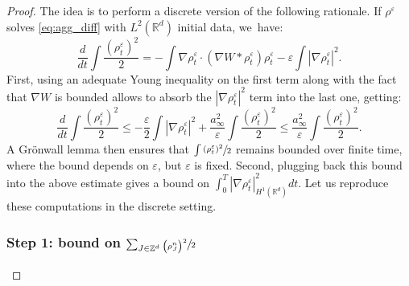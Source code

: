 \documentclass[JEP,XML,SOM,Unicode, NoFloatCountersInSection,published]{cedram}
\def\RR{\mathbb{R}}
\def\ZZ{\mathbb{Z}}
\def\eps{\varepsilon}
\theoremstyle{plain}
\theoremstyle{definition}
\begin{document}
\begin{proof}
The idea is to perform a discrete version of the following rationale. If $\rho^\eps$ solves \eqref{eq:agg_diff} with $L^2(\RR^d)$ initial data, we~have:
\[%
\frac{d}{dt} \int \frac{(\rho_t^\eps)^2}{2} = - \int \nabla \rho_t^\eps \cdot (\nabla W * \rho_t^\eps) \rho_t^\eps - \eps \int |\nabla \rho_t^\eps|^2.
\]
First, using an adequate Young inequality on the first term along with the fact that $\nabla W$ is bounded allows to absorb the $|\nabla \rho_t^\eps|^2$ term into the last one, getting:
\[
\frac{d}{dt} \int \frac{(\rho_t^\eps)^2}{2} \leq
- \frac{\eps}{2} \int |\nabla \rho_t^\eps|^2 + \frac{a_\infty^2}{\eps} \int \frac{(\rho_t^\eps)^2}{2} \leq \frac{a_\infty^2}{\eps} \int \frac{(\rho_t^\eps)^2}{2}.
\]
A Grönwall lemma then ensures that $\int \sfrac{(\rho_t^\eps)^2}{2}$ remains bounded over finite time, where the bound depends on $\eps$, but $\eps$ is fixed. Second, plugging back this bound into the above estimate gives a bound on $\int_0^T |\nabla \rho_t^\eps|_{H^1(\RR^d)}^2 dt$. Let us reproduce these computations in the discrete setting.

\subsubsection*{Step 1: bound on $\sum_{J \in \ZZ^d} \sfrac{\big(\rho_J^n\big)^2}{2}$}


\end{proof}
\end{document}
